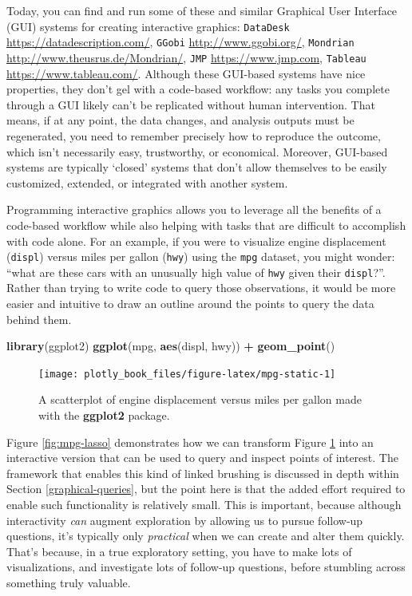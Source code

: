\documentclass[
  12pt,
]{krantz}
\newenvironment{Shaded}{\begin{snugshade}}{\end{snugshade}}
\newcommand{\KeywordTok}[1]{\textcolor[rgb]{0.13,0.29,0.53}{\textbf{#1}}}
\newcommand{\NormalTok}[1]{#1}
\newcommand{\OperatorTok}[1]{\textcolor[rgb]{0.81,0.36,0.00}{\textbf{#1}}}
\newcommand{\StringTok}[1]{\textcolor[rgb]{0.31,0.60,0.02}{#1}}
\begin{document}
Today, you can find and run some of these and similar Graphical User Interface (GUI) systems for creating interactive graphics: \texttt{DataDesk} \url{https://datadescription.com/}, \texttt{GGobi} \url{http://www.ggobi.org/}, \texttt{Mondrian} \url{http://www.theusrus.de/Mondrian/}, \texttt{JMP} \url{https://www.jmp.com}, \texttt{Tableau} \url{https://www.tableau.com/}. Although these GUI-based systems have nice properties, they don't gel with a code-based workflow: any tasks you complete through a GUI likely can't be replicated without human intervention. That means, if at any point, the data changes, and analysis outputs must be regenerated, you need to remember precisely how to reproduce the outcome, which isn't necessarily easy, trustworthy, or economical. Moreover, GUI-based systems are typically `closed' systems that don't allow themselves to be easily customized, extended, or integrated with another system.

Programming interactive graphics allows you to leverage all the benefits of a code-based workflow while also helping with tasks that are difficult to accomplish with code alone. For an example, if you were to visualize engine displacement (\texttt{displ}) versus miles per gallon (\texttt{hwy}) using the \texttt{mpg} dataset, you might wonder: ``what are these cars with an unusually high value of \texttt{hwy} given their \texttt{displ}?''. Rather than trying to write code to query those observations, it would be more easier and intuitive to draw an outline around the points to query the data behind them.

\begin{Shaded}
\begin{Highlighting}[]
\KeywordTok{library}\NormalTok{(ggplot2)}
\KeywordTok{ggplot}\NormalTok{(mpg, }\KeywordTok{aes}\NormalTok{(displ, hwy)) }\OperatorTok{+}\StringTok{ }\KeywordTok{geom_point}\NormalTok{()}
\end{Highlighting}
\end{Shaded}

\begin{figure}[H]

{\centering \texttt{[image: plotly\_book\_files/figure-latex/mpg-static-1]} 

}

\caption{A scatterplot of engine displacement versus miles per gallon made with the \textbf{ggplot2} package.}\label{fig:mpg-static}
\end{figure}

Figure \ref{fig:mpg-lasso} demonstrates how we can transform Figure \ref{fig:mpg-static} into an interactive version that can be used to query and inspect points of interest. The framework that enables this kind of linked brushing is discussed in depth within Section \ref{graphical-queries}, but the point here is that the added effort required to enable such functionality is relatively small. This is important, because although interactivity \emph{can} augment exploration by allowing us to pursue follow-up questions, it's typically only \emph{practical} when we can create and alter them quickly. That's because, in a true exploratory setting, you have to make lots of visualizations, and investigate lots of follow-up questions, before stumbling across something truly valuable.
\end{document}
